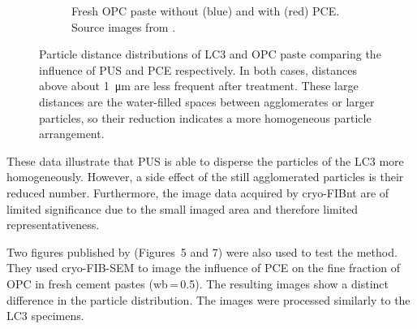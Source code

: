 \begin{figure}[H]
\begin{subfigure}[t]{0.495\textwidth}
		\caption{
            Fresh \ac{OPC} paste without ({\color{blue}blue}) and with ({\color{red}red}) \acs*{PCE}.
		    Source images from \cite{zingg.2008a}.
        }
		\label{fig:cryo-fib-results_2b}
	\end{subfigure}

    \caption{
		Particle distance distributions of \acs*{LC3} and \acs*{OPC} paste comparing the influence of \acs*{PUS} and \acs*{PCE} respectively.
		In both cases, distances above about \qty{1}{\micro\meter} are less frequent after treatment.
    	These large distances are the water-filled spaces between agglomerates or larger particles, so their reduction indicates a more homogeneous particle arrangement.
    }
    \label{fig:cryo-fib-results_2}
\end{figure}

These data illustrate that \ac{PUS} is able to disperse the particles of the \ac{LC3} more homogeneously.
However, a side effect of the still agglomerated particles is their reduced number.
Furthermore, the image data acquired by cryo-\ac{FIBnt} are of limited significance due to the small imaged area and therefore limited representativeness.

Two figures published by \textcite{zingg.2008a} (Figures~\num{5} and \num{7}) were also used to test the method.
They used cryo-\ac{FIB}-\ac{SEM} to image the influence of \ac{PCE} on the fine fraction of \ac{OPC} in fresh cement pastes (\ac{wb}\,=\,\num{0.5}).
The resulting images show a distinct difference in the particle distribution.
The images were processed similarly to the \ac{LC3} specimens.


